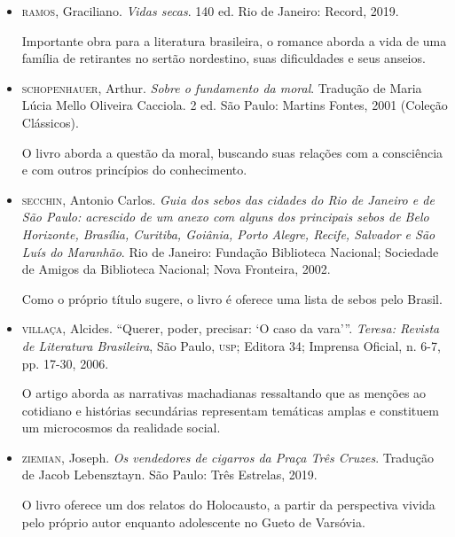 \documentclass[11pt]{extarticle}
\begin{document}
\begin{itemize}
\item \textsc{ramos}, Graciliano. \emph{Vidas secas}. 140 ed. Rio de Janeiro: Record, 
2019.

Importante obra para a literatura brasileira, o romance aborda a vida de uma 
família de retirantes no sertão nordestino, suas dificuldades e seus anseios.

\item \textsc{schopenhauer}, Arthur. \emph{Sobre o fundamento da moral}. Tradução de
Maria Lúcia Mello Oliveira Cacciola. 2 ed. São Paulo: Martins Fontes,
2001 (Coleção Clássicos).

O livro aborda a questão da moral, buscando suas relações com a consciência e 
com outros princípios do conhecimento.

\item \textsc{secchin}, Antonio Carlos. \emph{Guia dos sebos das cidades do Rio de
Janeiro e de São Paulo: acrescido de um anexo com alguns dos principais
sebos de Belo Horizonte, Brasília, Curitiba, Goiânia, Porto Alegre,
Recife, Salvador e São Luís do Maranhão}. Rio de Janeiro: Fundação
Biblioteca Nacional; Sociedade de Amigos da Biblioteca Nacional; Nova
Fronteira, 2002.

Como o próprio título sugere, o livro é oferece uma lista de sebos pelo Brasil.

\item \textsc{villaça}, Alcides. ``Querer, poder, precisar: `O caso da vara'''.
\emph{Teresa: Revista de Literatura Brasileira}, São Paulo, \textsc{usp}; Editora
34; Imprensa Oficial, n. 6-7, pp. 17-30, 2006.

O artigo aborda as narrativas machadianas ressaltando que as menções ao cotidiano 
e histórias secundárias representam temáticas amplas e constituem um microcosmos 
da realidade social. 

\item \textsc{ziemian}, Joseph. \emph{Os vendedores de cigarros da Praça Três Cruzes}.
Tradução de Jacob Lebensztayn. São Paulo: Três Estrelas, 2019.

O livro oferece um dos relatos do Holocausto, a partir da perspectiva vivida pelo 
próprio autor enquanto adolescente no Gueto de Varsóvia.

\end{itemize}
	
\end{document}
